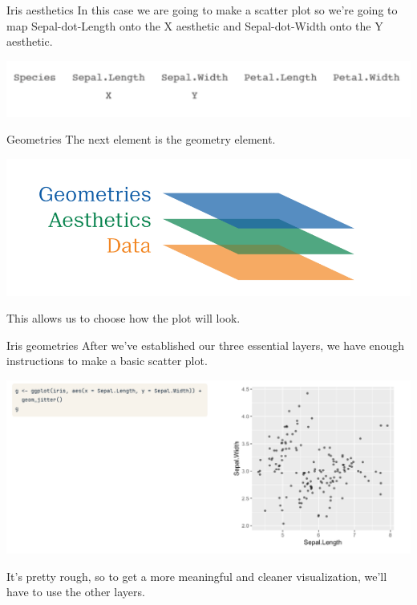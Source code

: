 \documentclass[
  ignorenonframetext,
]{beamer}
\begin{document}
\begin{frame}{Iris aesthetics}
\label{iris-aesthetics}
In this case we are going to make a scatter plot so we're going to map
Sepal-dot-Length onto the X aesthetic and Sepal-dot-Width onto the Y
aesthetic.

\includegraphics{../images/im130.png}
\end{frame}

\begin{frame}{Geometries}
\label{geometries}
The next element is the geometry element.

\includegraphics{../images/im131.png}

This allows us to choose how the plot will look.
\end{frame}

\begin{frame}{Iris geometries}
\label{iris-geometries}
After we've established our three essential layers, we have enough
instructions to make a basic scatter plot.

\includegraphics{../images/im132.png}

It's pretty rough, so to get a more meaningful and cleaner
visualization, we'll have to use the other layers.
\end{frame}
\end{document}
